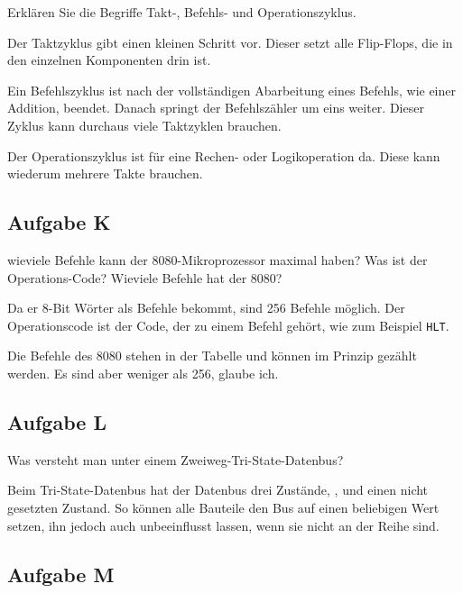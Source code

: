 \begin{problem}
	Erklären Sie die Begriffe Takt-, Befehls- und Operationszyklus.
\end{problem}

Der Taktzyklus gibt einen kleinen Schritt vor. Dieser setzt alle Flip-Flops,
die in den einzelnen Komponenten drin ist.

Ein Befehlszyklus ist nach der
vollständigen Abarbeitung eines Befehls, wie einer Addition, beendet. Danach
springt der Befehlszähler um eins weiter. Dieser Zyklus kann durchaus viele
Taktzyklen brauchen.

Der Operationszyklus ist für eine Rechen- oder Logikoperation da. Diese kann
wiederum mehrere Takte brauchen.

\subsection{Aufgabe K}

\begin{problem}
	wieviele Befehle kann der 8080-Mikroprozessor maximal haben? Was ist der
	Operations-Code? Wieviele Befehle hat der 8080?
\end{problem}

Da er 8-Bit Wörter als Befehle bekommt, sind 256 Befehle möglich. Der
Operationscode ist der Code, der zu einem Befehl gehört, wie zum Beispiel
\texttt{HLT}.

Die Befehle des 8080 stehen in der Tabelle und können im Prinzip gezählt
werden. Es sind aber weniger als 256, glaube ich.

\subsection{Aufgabe L}

\begin{problem}
	Was versteht man unter einem Zweiweg-Tri-State-Datenbus?
\end{problem}

Beim Tri-State-Datenbus hat der Datenbus drei Zustände, \thigh, \tlow{} und
einen nicht gesetzten Zustand. So können alle Bauteile den Bus auf einen
beliebigen Wert setzen, ihn jedoch auch unbeeinflusst lassen, wenn sie nicht an
der Reihe sind. \cite{matthes/bus_micro}

\subsection{Aufgabe M}

